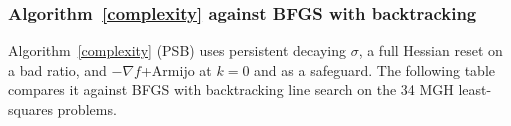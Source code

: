 \documentclass[11pt]{article}
\begin{document}

\subsubsection{Algorithm~\ref{complexity} against BFGS with backtracking}

Algorithm~\ref{complexity} (PSB) uses persistent decaying $\sigma$, a full Hessian reset on a bad
ratio, and $-\nabla f$+Armijo at $k=0$ and as a safeguard. The following
table compares it against BFGS with backtracking line search on the 34
MGH least-squares problems.
\end{document}
